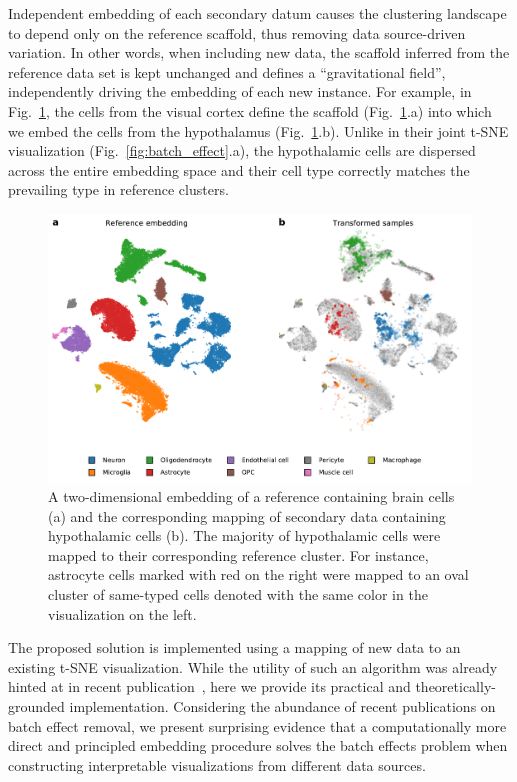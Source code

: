 \documentclass[runningheads]{llncs}
\begin{document}
Independent embedding of each secondary datum causes the clustering landscape
to depend only on the reference scaffold, thus removing data source-driven
variation. In other words, when including new data, the scaffold inferred from
the reference data set is kept unchanged and defines a ``gravitational
field'', independently driving the embedding of each new instance. For example, in
Fig.~\ref{fig:transform_brain}, the cells from the visual cortex define the
scaffold (Fig.~\ref{fig:transform_brain}.a) into which we embed the cells from the
hypothalamus (Fig.~\ref{fig:transform_brain}.b). Unlike in their joint t\nobreakdash -SNE
visualization (Fig.~\ref{fig:batch_effect}.a), the hypothalamic cells are
dispersed across the entire embedding space and their cell type correctly matches
the prevailing type in reference clusters.

\begin{figure}[htb]
\includegraphics[width=\textwidth]{figures/transform_brain.pdf}
\caption{A two-dimensional embedding of a reference containing brain cells (a) and
the corresponding mapping of secondary data containing hypothalamic cells (b). 
The majority of hypothalamic cells were mapped to their corresponding
reference cluster. For instance, astrocyte cells marked with red on the
right were mapped to an oval cluster of same-typed cells denoted with the same
color in the visualization on the left.} \label{fig:transform_brain}
\end{figure}

The proposed solution is implemented using a mapping of
new data to an existing t-SNE visualization. While the
utility of such an algorithm was already hinted at in recent
publication~\cite{art_of_using_tsne}, here we provide its practical and
theoretically-grounded implementation. Considering the abundance of recent
publications on batch effect removal, we present surprising evidence that a
computationally more direct and principled embedding procedure solves the batch
effects problem when constructing interpretable visualizations from different
data sources.
\end{document}
